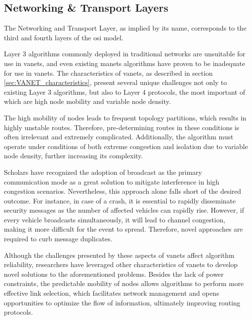 \subsection[Networking \& Transport Layers]{Networking \& Transport Layers}
\label{subsec:networking_transport_layers}
The Networking and Transport Layer, as implied by its name, corresponds to the third and fourth layers of the \gls{osi} model.

Layer 3 algorithms commonly deployed in traditional networks are unsuitable for use in \glspl{vanet}\cite{toor_vehicle_2008}, and even existing \glspl{manet} algorithms have proven to be inadequate for use in \glspl{vanet}\cite{liang_vehicular_2015}. The characteristics of \glspl{vanet}, as described in section \ref{sec:VANET_characteristics}, present several unique challenges not only to existing Layer 3 algorithms, but also to Layer 4 protocols, the most important of which are high node mobility and variable node density.

The high mobility of nodes leads to frequent topology partitions, which results in highly unstable routes. Therefore, pre-determining routes in these conditions is often irrelevant and extremely complicated. Additionally, the algorithm must operate under conditions of both extreme congestion and isolation due to variable node density, further increasing its complexity.

Scholars have recognized the adoption of broadcast as the primary communication mode as a great solution to mitigate interference in high congestion scenarios. Nevertheless, this approach alone falls short of the desired outcome. For instance, in case of a crash, it is essential to rapidly disseminate security messages as the number of affected vehicles can rapidly rise. However, if every vehicle broadcasts simultaneously, it will lead to channel congestion, making it more difficult for the event to spread\cite{toor_vehicle_2008}. Therefore, novel approaches are required to curb message duplicates. 

Although the challenges presented by these aspects of \glspl{vanet} affect algorithm reliability, researchers have leveraged other characteristics of \glspl{vanet} to develop novel solutions to the aforementioned problems. Besides the lack of power constraints, the predictable mobility of nodes allows algorithms to perform more effective link selection, which facilitates network management and opens opportunities to optimize the flow of information, ultimately improving routing protocols.

